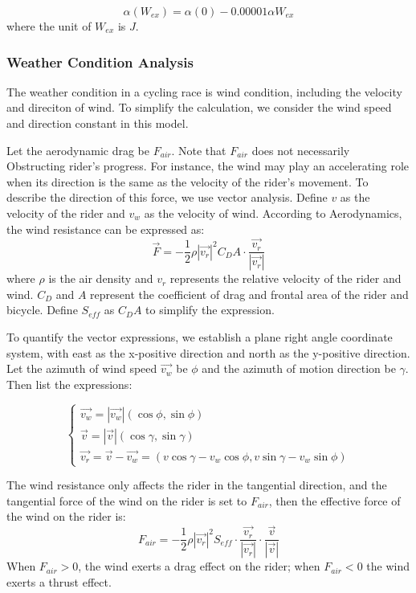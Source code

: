 \documentclass{mcmthesis}
\newcommand{\upcite}[1]{\textsuperscript{\textsuperscript{\cite{#1}}}}
\begin{document}
\begin{equation}
	\alpha (W_{ex})=\alpha(0)-0.00001\alpha W_{ex}
\end{equation}
where the unit of $W_{ex}$ is $J$.



\subsubsection{Weather Condition Analysis}
\qquad
The weather condition in a cycling race is wind condition, including the velocity and direciton of wind. To simplify the calculation, we consider the wind speed and direction constant in this model.

Let the aerodynamic drag be $F_{air}$. Note that $F_{air}$ does not necessarily Obstructing rider's progress. For instance, the wind may play an accelerating role when its direction is the same as the velocity of the rider's movement. To describe the direction of this force, we use vector analysis. Define $v$ as the velocity of the rider and $v_w$ as the velocity of wind. According to Aerodynamics\upcite{4,6}, the wind resistance can be expressed as:
\begin{equation}
	\vec{F}=-\frac{1}{2}\rho {|\vec{v_r}|}^2 C_D A\cdot \frac{\vec{v_r}}{|\vec{v_r}|}
\end{equation}
where $\rho$ is the air density and $v_r$ represents the relative velocity of the rider and wind. $C_D$ and $A$ represent the coefficient of drag and frontal area of the rider and bicycle. Define $S_{eff}$ as $C_DA$ to simplify the expression.

To quantify the vector expressions, we establish a plane right angle coordinate system, with east as the x-positive direction and north as the y-positive direction. Let the azimuth of wind speed $\vec{v_w}$ be $\phi$ and the azimuth of motion direction be $\gamma$. Then list the expressions:

\begin{equation}
	\begin{cases} 	
		\vec{v_w}=|\vec{v_w}|(\cos\phi,\sin\phi)\\
		\vec{v}=|\vec{v}|(\cos\gamma,\sin\gamma)\\
		\vec{v_r}=\vec{v}-\vec{v_w}=(v\cos\gamma-v_w\cos\phi,v\sin\gamma-v_w\sin\phi)
	\end{cases}
\end{equation}


The wind resistance only affects the rider in the tangential direction, and the tangential force of the wind on the rider is set to $F_{air}$, then the effective force of the wind on the rider is:
\begin{equation}
	F_{air}=-\frac{1}{2}\rho {|\vec{v_r}|}^2  S_{eff}\cdot \frac{\vec{v_r}}{|\vec{v_r}|}\cdot \frac{\vec{v}}{|\vec{v}|}
\end{equation}
When $F_{air}>0$, the wind exerts a drag effect on the rider; when $F_{air}<0$ the wind exerts a thrust effect.
\end{document}
